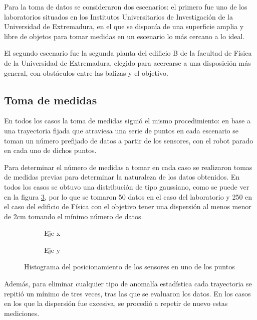 Para la toma de datos se consideraron dos escenarios: el primero fue uno de los laboratorios situados en los Institutos Universitarios de Investigación de la Universidad de Extremadura, en el que se disponía de una superficie amplia y libre de objetos para tomar medidas en un escenario lo más cercano a lo ideal.

El segundo escenario fue la segunda planta del edificio B de la facultad de Física de la Universidad de Extremadura, elegido para acercarse a una disposición más general, con obstáculos entre las balizas y el objetivo.

\subsection{Toma de medidas}

En todos los casos la toma de medidas siguió el mismo procedimiento: en base a una trayectoria fijada que atraviesa una serie de puntos en cada escenario se toman un número prefijado de datos a partir de los sensores, con el robot parado en cada uno de dichos puntos.

Para determinar el número de medidas a tomar en cada caso se realizaron tomas de medidas previas para determinar la naturaleza de los datos obtenidos.
En todos los casos se obtuvo una distribución de tipo gaussiano, como se puede ver en la figura \ref{fig:datos_sensor}, por lo que se tomaron 50 datos en el caso del laboratorio y 250 en el caso del edificio de Física con el objetivo tener una dispersión al menos menor de 2cm tomando el mínimo número de datos.

\begin{figure}[H]
  \begin{subfigure}[b]{.5\textwidth}
    \centering
     
    \caption{Eje x}
    \label{fig:hist_x}
  \end{subfigure}
  \begin{subfigure}[b]{.5\textwidth}
    \centering
    
    \caption{Eje y}
    \label{fig:hist_y}
  \end{subfigure}
  \caption{Histograma del posicionamiento de los sensores en uno de los puntos}
  \label{fig:datos_sensor}
\end{figure}

Además, para eliminar cualquier tipo de anomalía estadística cada trayectoria se repitió un mínimo de tres veces, tras las que se evaluaron los datos.
En los casos en los que la dispersión fue excesiva, se procedió a repetir de nuevo estas mediciones.

